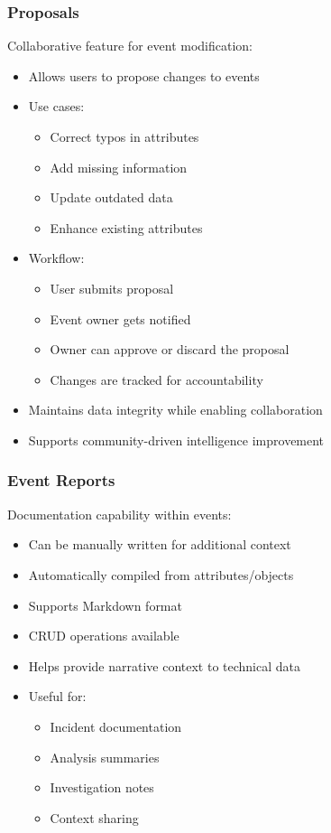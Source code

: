 \subsubsection{Proposals}
Collaborative feature for event modification:
\begin{itemize}
    \item Allows users to propose changes to events
    \item Use cases:
        \begin{itemize}
            \item Correct typos in attributes
            \item Add missing information
            \item Update outdated data
            \item Enhance existing attributes
        \end{itemize}
    \item Workflow:
        \begin{itemize}
            \item User submits proposal
            \item Event owner gets notified
            \item Owner can approve or discard the proposal
            \item Changes are tracked for accountability
        \end{itemize}
    \item Maintains data integrity while enabling collaboration
    \item Supports community-driven intelligence improvement
\end{itemize}

\subsubsection{Event Reports}
Documentation capability within events:
\begin{itemize}
    \item Can be manually written for additional context
    \item Automatically compiled from attributes/objects
    \item Supports Markdown format
    \item CRUD operations available
    \item Helps provide narrative context to technical data
    \item Useful for:
        \begin{itemize}
            \item Incident documentation
            \item Analysis summaries
            \item Investigation notes
            \item Context sharing
        \end{itemize}
\end{itemize}

